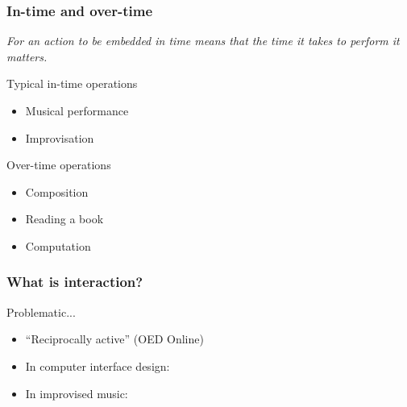 \documentclass[]{beamer}
\begin{document}
\begin{frame}
  \frametitle{In-time and over-time}
  \begin{block}{}
    \emph{For an action to be embedded in time means that the time it takes to perform it matters.}
  \end{block}
  \pause[2]
  \begin{block}{Typical in-time operations}
    \begin{itemize}
    \item Musical performance
    \item Improvisation
    \end{itemize}
  \end{block}
  \pause[3]
  \begin{block}{Over-time operations}
    \begin{itemize}
    \item Composition
    \item Reading a book
    \item Computation
    \end{itemize}
  \end{block}
\end{frame}

\begin{frame}
  \frametitle{What is interaction?}
  \pause[2]
    \begin{block}{Problematic...}
      \begin{itemize}
      \item<3-> ``Reciprocally active'' (OED Online)
      \item<4-> In computer interface design: 
      \item<5-> In improvised music: 
      \end{itemize}
    \end{block}
\end{frame}
\end{document}
